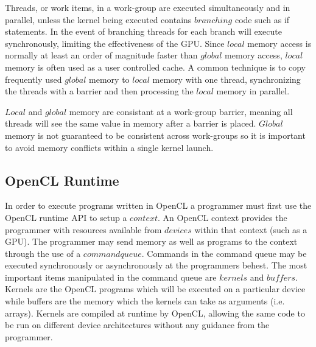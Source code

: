 Threads, or work items, in a work-group are executed simultaneously and in
parallel, unless the kernel being executed contains $branching$ code such as if
statements. In the event of branching threads for each branch will execute
synchronously, limiting the effectiveness of the GPU. Since $local$ memory
access is normally at least an order of magnitude faster than $global$ memory
access, $local$ memory is often used as a user controlled cache. A common
technique is to copy frequently used $global$ memory to $local$ memory with one
thread, synchronizing the threads with a barrier and then processing the
$local$ memory in parallel. 


$Local$ and $global$ memory are consistant at a work-group barrier, meaning all
threads will see the same value in memory after a barrier is placed. $Global$
memory is not guaranteed to be consistent across work-groups so it is important
to avoid memory conflicts within a single kernel launch.

\subsection{OpenCL Runtime}

In order to execute programs written in OpenCL a programmer must first use the
OpenCL runtime API to setup a $context$. An OpenCL context provides the
programmer with resources available from $devices$ within that context (such as
a GPU). The programmer may send memory as well as programs to the context
through the use of a $command queue$. Commands in the command queue may be
executed synchronously or asynchronously at the programmers behest. The most
important items manipulated in the command queue are $kernels$ and $buffers$.
Kernels are the OpenCL programs which will be executed on a particular device
while buffers are the memory which the kernels can take as arguments (i.e.
arrays). Kernels are compiled at runtime by OpenCL, allowing the same code to
be run on different device architectures without any guidance from the
programmer.



